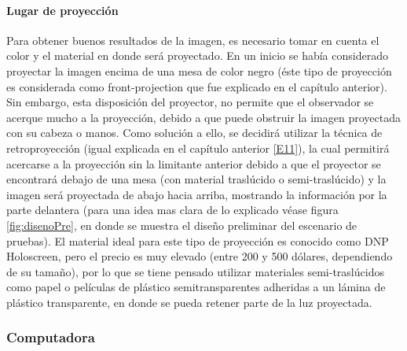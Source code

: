 \documentclass[a4paper,openright,12pt]{report}
\begin{document}
\paragraph{Lugar de proyección}
Para obtener buenos resultados de la imagen, es necesario tomar en cuenta el color y el material en donde será proyectado. En un inicio se había considerado proyectar la imagen encima de una mesa de color negro (éste tipo de proyección es considerada como front-projection que fue explicado en el capítulo anterior). Sin embargo, esta disposición del proyector, no permite que el observador se acerque mucho a la proyección, debido a que puede obstruir la imagen proyectada con su cabeza o manos. Como solución a ello, se decidirá utilizar la técnica de retroproyección (igual explicada en el capítulo anterior \hyperlink{e11}{[E11]}), la cual permitirá acercarse a la proyección sin la limitante anterior debido a que el proyector se encontrará debajo de una mesa (con material traslúcido o semi-traslúcido) y la imagen será proyectada de abajo hacia arriba, mostrando la información por la parte delantera (para una idea mas clara de lo explicado véase figura \ref{fig:disenoPre}, en donde se muestra el diseño preliminar del escenario de pruebas). El material ideal para este tipo de proyección es conocido como DNP Holoscreen, pero el precio es muy elevado (entre 200 y 500 dólares, dependiendo de su tamaño), por lo que se tiene pensado utilizar materiales semi-traslúcidos como papel o películas de plástico semitransparentes adheridas a un lámina de plástico transparente, en donde se pueda retener parte de la luz proyectada.\\
\subsubsection{Computadora}
\end{document}
